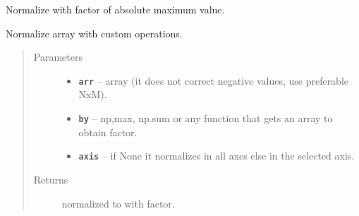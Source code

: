 \documentclass[letterpaper,10pt,english]{sphinxmanual}
\begin{document}

\begin{fulllineitems}
\label{RRtoolbox.lib.arrayops:RRtoolbox.lib.arrayops.basic.normalize2}
Normalize with factor of absolute maximum value.

\end{fulllineitems}


\begin{fulllineitems}
\label{RRtoolbox.lib.arrayops:RRtoolbox.lib.arrayops.basic.normalizeCustom}
Normalize array with custom operations.
\begin{quote}\begin{description}
\item[{Parameters}] \leavevmode\begin{itemize}
\item {} 
\textbf{\texttt{arr}} -- array (it does not correct negative values, use preferable NxM).

\item {} 
\textbf{\texttt{by}} -- np,max, np.sum or any function that gets an array to obtain factor.

\item {} 
\textbf{\texttt{axis}} -- if None it normalizes in all axes else in the selected axis.

\end{itemize}

\item[{Returns}] \leavevmode
normalized to with factor.

\end{description}\end{quote}

\end{fulllineitems}

\end{document}
